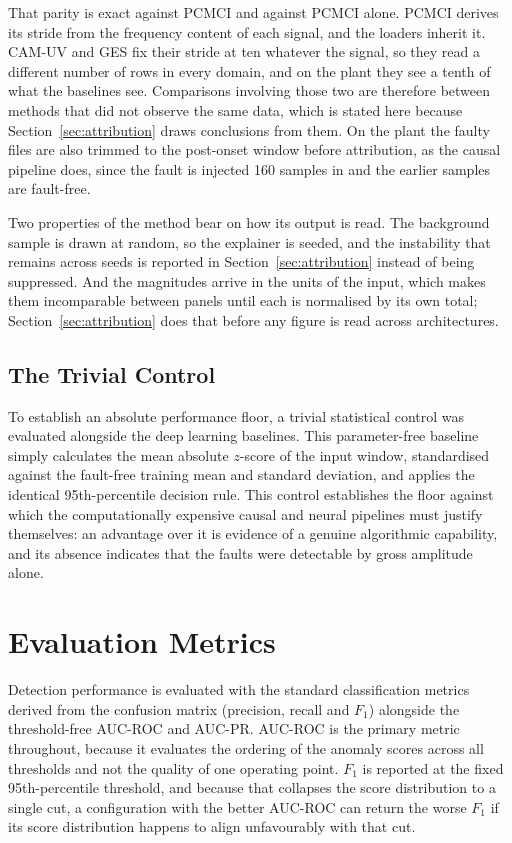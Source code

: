 That parity is exact against PCMCI and against PCMCI alone. PCMCI derives its
stride from the frequency content of each signal, and the loaders inherit it.
CAM-UV and GES fix their stride at ten whatever the signal, so they read a
different number of rows in every domain, and on the plant they see a tenth of
what the baselines see. Comparisons involving those two are therefore between
methods that did not observe the same data, which is stated here because
Section~\ref{sec:attribution} draws conclusions from them. On the plant the
faulty files are also trimmed to the post-onset window before attribution, as
the causal pipeline does, since the fault is injected 160 samples in and the
earlier samples are fault-free.

Two properties of the method bear on how its output is read. The background
sample is drawn at random, so the explainer is seeded, and the instability that
remains across seeds is reported in Section~\ref{sec:attribution} instead of
being suppressed. And the magnitudes arrive in the units of the input, which
makes them incomparable between panels until each is normalised by its own
total; Section~\ref{sec:attribution} does that before any figure is read across
architectures.

\subsection{The Trivial Control}
\label{sec:trivial-control}
To establish an absolute performance floor, a trivial statistical control was evaluated alongside the deep learning baselines. This parameter-free baseline simply calculates the mean absolute $z$-score of the input window, standardised against the fault-free training mean and standard deviation, and applies the identical 95th-percentile decision rule. This control establishes the floor against which the computationally expensive causal and neural pipelines must justify themselves: an advantage over it is evidence of a genuine algorithmic capability, and its absence indicates that the faults were detectable by gross amplitude alone.

\section{Evaluation Metrics}
\label{sec:metrics}

Detection performance is evaluated with the standard classification metrics derived from the confusion matrix (precision, recall and $F_1$) alongside the threshold-free AUC-ROC and AUC-PR. AUC-ROC is the primary metric throughout, because it evaluates the ordering of the anomaly scores across all thresholds and not the quality of one operating point. $F_1$ is reported at the fixed 95th-percentile threshold, and because that collapses the score distribution to a single cut, a configuration with the better AUC-ROC can return the worse $F_1$ if its score distribution happens to align unfavourably with that cut.

